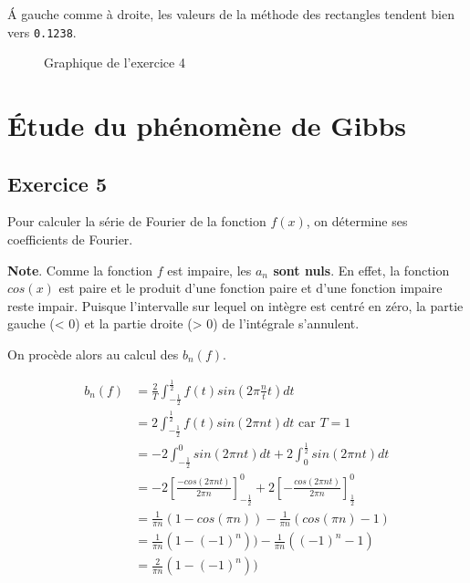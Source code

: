 \documentclass[a4paper,11pt]{article}
\theoremstyle{nonumberplain}
\theoremstyle{nonumberplain}
\theoremstyle{nonumberplain}
\begin{document}
    \'{A} gauche comme à droite, les valeurs de la méthode des rectangles tendent bien vers \texttt{0.1238}.
    \begin{figure}[H]
        \centering
        \caption{\label{graph_exo4} Graphique de l'exercice 4}
    \end{figure}


\section{\'{E}tude du phénomène de Gibbs}

\subsection*{Exercice 5}

    Pour calculer la série de Fourier de la fonction $f(x)$, on détermine ses coefficients de Fourier.

    \begin{mdframed}[backgroundcolor=gray!10]
        \textbf{Note}. Comme la fonction $f$ est impaire, les \textbf{$a_{n}$ sont nuls}.
        En effet, la fonction $cos(x)$ est paire et le produit d'une fonction paire et d'une fonction impaire reste impair. Puisque
        l'intervalle sur lequel on intègre est centré en zéro, la partie gauche (< 0) et la
        partie droite (> 0) de l'intégrale s'annulent.
    \end{mdframed}

    On procède alors au calcul des $b_{n}(f)$.

    \begin{equation*}
        \begin{split}
            b_{n}(f)    & = \frac{2}{T}\int_{-\frac{1}{2}}^{\frac{1}{2}} f(t)sin(2 \pi \frac{n}{t} t) dt \\
                        & = 2\int_{-\frac{1}{2}}^{\frac{1}{2}} f(t)sin(2 \pi n t) dt \text{ car } T = 1 \\
                        & = -2\int_{-\frac{1}{2}}^{0} sin(2 \pi n t) dt + 2\int_{0}^{\frac{1}{2}} sin(2 \pi n t) dt \\
                        & = -2\left[\frac{-cos(2 \pi n t)}{2 \pi n}\right]_{-\frac{1}{2}}^{0} + 2\left[-\frac{cos(2 \pi n t)}{2 \pi n}\right]_{\frac{1}{2}}^{0} \\
                        & = \frac{1}{\pi n}(1 - cos(\pi n)) - \frac{1}{\pi n}(cos(\pi n) - 1) \\
                        & = \frac{1}{\pi n}(1 - (-1)^n)) - \frac{1}{\pi n}((-1)^n - 1) \\
                        & = \frac{2}{\pi n}(1 - (-1)^n))
        \end{split}
    \end{equation*}
\end{document}
